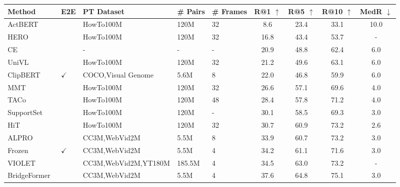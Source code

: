 \documentclass[10pt,twocolumn,letterpaper]{article}
\begin{document}
\begin{table*}[]
    \centering
    \small
        \begin{tabular}{ll|lll|cccc}
        \toprule
        \textbf{Method}       & \textbf{E2E} & \textbf{PT Dataset} & \textbf{\# Pairs}  & \textbf{\# Frames} & \textbf{R@1} $\uparrow$   & \textbf{R@5} $\uparrow$   & \textbf{R@10}  $\uparrow$  & \textbf{MedR}  $\downarrow$\\ \midrule
        ActBERT ~\cite{actbert}    &   & HowTo100M & 120M  & 32  & 8.6  & 23.4                     & 33.1      & 10.0              \\
        HERO~\cite{hero}  &   & HowTo100M          & 120M     & 32  & 16.8 & 43.4                     & 53.7       & -              \\
        CE~\cite{ce}        &   & -     & -    &  -  & 20.9  & 48.8 & 62.4     & 6.0              \\
        UniVL~\cite{UniVL}        &   & HowTo100M     & 120M    &  32  & 21.2 & 49.6                     & 63.1       & 6.0              \\
        ClipBERT~\cite{clipbert}    & $\checkmark$ & COCO,Visual Genome       & 5.6M   & 8    & 22.0 & 46.8             & 59.9     & 6.0               \\
        MMT ~\cite{mmt}       &   & HowTo100M          & 120M   &  32  & 26.6 & 57.1           & 69.6     & 4.0                \\
        TACo ~\cite{taco}        &   & HowTo100M   & 120M   &  48   & 28.4 & 57.8    & 71.2     & 4.0                \\
        SupportSet  ~\cite{support}        &   & HowTo100M          & 120M  &  -    & 30.1 & 58.5                     & 69.3     & 3.0                \\
        HiT  ~\cite{HiT}        &   & HowTo100M          & 120M    &  32 & 30.7 & 60.9  & 73.2     & 2.6                \\
        ALPRO  ~\cite{alpro}      &   & CC3M,WebVid2M       & 5.5M   &  8  & 33.9 & 60.7                     & 73.2   & 3.0                   \\
        Frozen~\cite{Frozen}       & $\checkmark$ & CC3M,WebVid2M        & 5.5M   &  4   & 34.2 & 61.1       & 71.6           & 3.0 \\
        VIOLET~\cite{VIOLET}      &   & CC3M,WebVid2M,YT180M      & 185.5M   &  4  & 34.5 & 63.0                     & 73.2  & -                   \\
        BridgeFormer~\cite{BridgeFormer} &   & CC3M,WebVid2M        & 5.5M   &   4   & 37.6 & 64.8                     & 75.1     & 3.0                \\

\end{tabular}
\end{table*}
\end{document}
